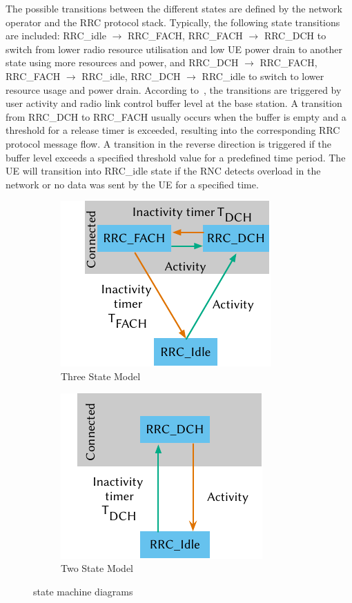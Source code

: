 The possible transitions between the different states are defined by the network operator and the \gls{RRC} protocol stack.
Typically, the following state transitions are included: 
\gls{RRC_idle} \(\rightarrow\) \gls{RRC_FACH},
\gls{RRC_FACH} \(\rightarrow\) \gls{RRC_DCH} to switch from lower radio resource utilisation and low \gls{UE} power drain to another state using more resources and power, and 
\gls{RRC_DCH} \(\rightarrow\) \gls{RRC_FACH}, 
\gls{RRC_FACH} \(\rightarrow\) \gls{RRC_idle},
\gls{RRC_DCH} \(\rightarrow\) \gls{RRC_idle} to switch to lower resource usage and power drain.
According to~\cite{Perala2009,Qian2010a}, the transitions are triggered by user activity and radio link control buffer level at the base station. 
A transition from \gls{RRC_DCH} to \gls{RRC_FACH} usually occurs when the buffer is empty and a threshold for a release timer is exceeded, resulting into the corresponding \gls{RRC} protocol message flow.
A transition in the reverse direction is triggered if the buffer level exceeds a specified threshold value for a predefined time period.
The \gls{UE} will transition into \gls{RRC_idle} state if the \gls{RNC} detects overload in the network or no data was sent by the \gls{UE} for a specified time.

\begin{figure}
	\begin{subfigure}[b]{.5\textwidth}
	\centering
	\includegraphics{network/background/figures/three_states}
	\caption{Three State Model}\label{fig:network:background:rrc_state_machines:three_states}
	\end{subfigure}
	\begin{subfigure}[b]{.5\textwidth}
	\centering
	\includegraphics{network/background/figures/two_states}
	\caption{Two State Model}\label{fig:network:background:rrc_state_machines:two_states}
	\end{subfigure}
	\caption{ state machine diagrams}\label{fig:network:background:rrc_state_machines}
\end{figure}


